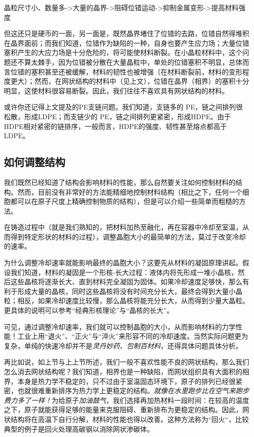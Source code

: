 晶粒尺寸小、数量多->大量的晶界->阻碍位错运动->抑制金属变形->提高材料强度

但这还只是硬币的一面，另一面是，既然晶界堵住了位错的去路，位错自然得堆积在晶界面前；而我们知道，位错作为缺陷的一种，自身也要产生应力场；大量位错塞积产生的大应力场是十分危险的，将可能使材料断裂。在小晶粒材料中，这个问题还不算太棘手，因为位错被分散在大量晶粒中，单处的位错塞积不明显，总体而言位错的塞积甚至还被缓解，材料的韧性也被增强（在材料断裂前，材料的变形程度更大）；然而，在网状结构的材料中（见上文），位错在晶界（相界）的塞积十分明显，这使材料很容易断裂。因此，我们往往不喜欢具有网状结构的材料。

或许你还记得上文提及的PE支链问题。我们知道，支链多的 PE，链之间排列很松散，形成LDPE；而支链少的 PE，链之间排列更紧密，形成HDPE。由于HDPE相对紧密的链排序，一般而言，HDPE的强度、韧性甚至熔点都高于LDPE。

\subsection{如何调整结构}

我们既然已经知道了结构会影响材料的性能，那么自然要关注如何控制材料的结构。然而，目前没有非常好的方法能精细地控制材料结构（相比之下，任何一个细胞都可以在原子尺度上精确控制物质的结构），但是可以介绍一些简单而粗糙的方法。

在铸造过程中（就是我们熟知的，把材料加热至融化，再在容器中冷却至室温，从而得到特定形状的材料的过程），调整晶胞大小的最简单的方法，莫过于改变冷却的速率。

为什么调整冷却速率就能影响最终的晶胞大小？这要先从材料的凝固原理讲起。假设我们知道，材料的凝固是一个形核-长大过程：液体内将先形成一堆小晶核，然后这些晶核将逐渐长大、直到材料完全凝固为固体。如果冷却速度足够快，那么有利于形成大量的晶核，同时这些晶核将没有时间充分长大，最终会得到大量小晶粒；相反，如果冷却速度比较慢，那么晶核将能充分长大，从而得到少量大晶粒。更具体的说明可以参考“经典形核理论”与“晶核的长大”。

可见，通过调整冷却速率，我们就可以控制晶胞的大小，从而影响材料的力学性能！工业上用“退火”、“正火”与“淬火”来形容不同的冷却速度。当然实际问题更为复杂，单纯的快速冷却并不是\textsl{灵丹妙药、包制百材料}，还得具体问题具体分析。

再比如说，如上节与上上节所述，我们一般不喜欢性能不良的网状结构，那么我们怎么消去网状结构呢？我们知道，相界也是一种缺陷，而网状组织具有大面积的相界，本身是热力学不稳定的，只不过由于室温固态环境下，原子的排列已经很紧密，也就很难重新排序为热力学上更稳定的结构。\textsl{就像在水里跑步比在空气来跑步费力多了一样！}为给原子\textsl{加油鼓气}，我们选择再加热材料一段时间：在较高的温度之下，原子就能获得足够的能量来克服阻碍、重新排布为更稳定的结构。因此，网状结构将在高温下自行分解，材料的性能也得以改善。这种方法称为“回火“，比较典型的例子是回火处理高碳钢以消除网状渗碳体。

